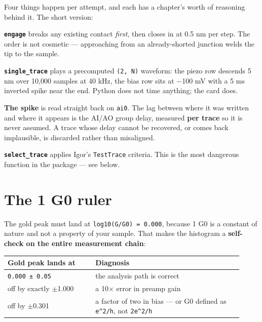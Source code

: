 Four things happen per attempt, and each has a chapter's worth of reasoning behind it. The short version:

\textbf{\texttt{engage}} breaks any existing contact \emph{first}, then closes in at 0.5 nm per step. The order is not cosmetic --- approaching from an already-shorted junction welds the tip to the sample.

\textbf{\texttt{single\_\discretionary{}{}{}trace}} plays a precomputed \texttt{(2,\discretionary{}{}{} N)} waveform: the piezo row descends 5 nm over 10,000 samples at 40 kHz, the bias row sits at −100 mV with a 5 ms inverted spike near the end. Python does not time anything; the card does.

\textbf{The spike} is read straight back on \texttt{ai0}. The lag between where it was written and where it appears is the AI/AO group delay, measured \textbf{per trace} so it is never assumed. A trace whose delay cannot be recovered, or comes back implausible, is discarded rather than misaligned.

\textbf{\texttt{select\_\discretionary{}{}{}trace}} applies Igor's \texttt{Test\discretionary{}{}{}Trace} criteria. This is the most dangerous function in the package --- see below.

\section{The 1 G0 ruler}

The gold peak must land at \texttt{log10(G/\discretionary{}{}{}G0) = 0.\discretionary{}{}{}000}, because 1 G0 is a constant of nature and not a property of your sample. That makes the histogram a \textbf{self-check on the entire measurement chain}:

\small\setlength{\LTleft}{0pt}\setlength{\LTright}{\fill}
\begin{longtable}{@{}>{\raggedright\arraybackslash}p{0.34\linewidth}>{\raggedright\arraybackslash}p{0.58\linewidth}@{}}
\toprule
\textbf{Gold peak lands at} & \textbf{Diagnosis} \\
\midrule\endhead
\texttt{0.\discretionary{}{}{}000 ± 0.\discretionary{}{}{}05} & the analysis path is correct \\
off by exactly $\pm$1.000 & a 10$\times$ error in preamp gain \\
off by $\pm$0.301 & a factor of two in bias --- or G0 defined as \texttt{e\textasciicircum{}2/\discretionary{}{}{}h}, not \texttt{2e\textasciicircum{}2/\discretionary{}{}{}h} \\
\bottomrule
\end{longtable}
\normalsize


